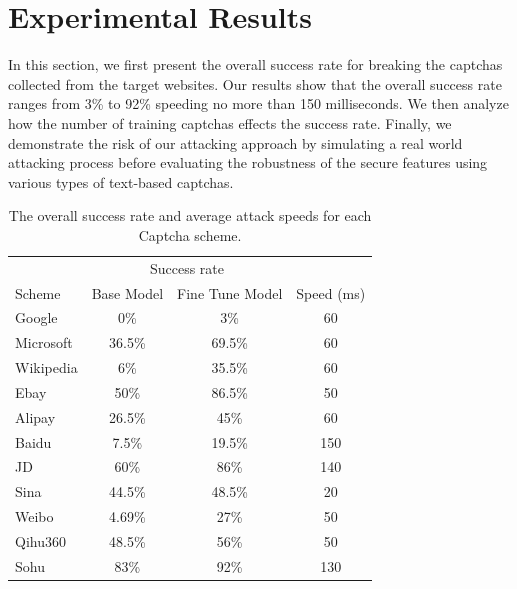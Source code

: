 \section{Experimental Results}
In this section, we first present the overall success rate for breaking the captchas collected from the target websites. Our results show that the overall success rate ranges from 3\% to 92\% speeding no more than 150 milliseconds.
We then analyze how the number of training captchas effects the success rate.
Finally, we demonstrate the risk of our attacking approach by simulating a real world attacking process before evaluating the robustness of the secure features using various types of text-based captchas.

\begin{table}[t]
    \centering
    \small
    \caption{The overall success rate and average attack speeds for each Captcha scheme.}
    \label{table: current_rate}
    \begin{tabular}{lccc}
        \toprule
        & \multicolumn{2}{c}{Success rate} & \\
        \cline{2-3}
        \multirow{-2}{*}{Scheme} & Base Model & Fine Tune Model  & \multirow{-2}{*}{Speed (ms)}\\
        \midrule
        Google & 0\% & 3\% & 60 \\
        Microsoft & 36.5\% & 69.5\% & 60 \\
        Wikipedia & 6\% & 35.5\% & 60 \\
        Ebay & 50\% & 86.5\% & 50 \\
        Alipay & 26.5\% & 45\% & 60 \\
        Baidu & 7.5\% & 19.5\% & 150 \\
        JD & 60\% & 86\% & 140 \\
        Sina & 44.5\% & 48.5\% & 20 \\
        Weibo & 4.69\% & 27\% & 50 \\
        Qihu360 & 48.5\% & 56\% & 50 \\
        Sohu & 83\% & 92\% & 130 \\
        \bottomrule
    \end{tabular}
\end{table}

